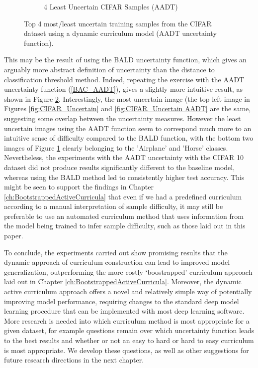 \begin{figure}[h!]
\begin{subfigure}{0.7\textwidth}
  \caption{4 Least Uncertain CIFAR Samples (AADT)}
  \label{fig:CIFAR Certain AADT}
\end{subfigure}
\caption{Top 4 most/least uncertain training samples from the CIFAR dataset using a dynamic curriculum model (AADT uncertainty function).}
\label{fig:CIFARSampleUncertaintyAADT}
\end{figure}
This may be the result of using the BALD uncertainty function, which gives an arguably more abstract definition of uncertainty than the distance to classification threshold method. Indeed, repeating the exercise with the AADT uncertainty function (\ref{BAC_AADT}), gives a slightly more intuitive result, as shown in Figure \ref{fig:CIFARSampleUncertaintyAADT}. Interestingly, the most uncertain image (the top left image in Figures \ref{fig:CIFAR_Uncertain} and \ref{fig:CIFAR_Uncertain AADT} are the same, suggesting some overlap between the uncertainty measures. However the least uncertain images using the AADT function seem to correspond much more to an intuitive sense of difficulty compared to the BALD function, with the bottom two images of Figure \ref{fig:CIFAR Certain AADT} clearly belonging to the 'Airplane' and 'Horse' classes. Nevertheless, the experiments with the AADT uncertainty with the CIFAR 10 dataset did not produce results significantly different to the baseline model, whereas using the BALD method led to consistently higher test accuracy. This might be seen to support the findings in Chapter \ref{ch:BootstrappedActiveCurricula} that even if we had a predefined curriculum according to a manual interpretation of sample difficulty, it may still be preferable to use an automated curriculum method that uses information from the model being trained to infer sample difficulty, such as those laid out in this paper. 

To conclude, the experiments carried out show promising results that the dynamic approach of curriculum construction can lead to improved model generalization, outperforming the more costly `boostrapped' curriculum approach laid out in Chapter \ref{ch:BootstrappedActiveCurricula}. Moreover, the dynamic active curriculum approach offers a novel and relatively simple way of potentially improving model performance, requiring changes to the standard deep model learning procedure that can be implemented with most deep learning software. More research is needed into which curriculum method is most appropriate for a given dataset, for example questions remain over which uncertainty function leads to the best results and whether or not an easy to hard or hard to easy curriculum is most appropriate. We develop these questions, as well as other suggestions for future research directions in the next chapter.




